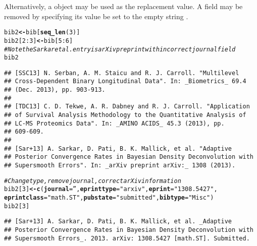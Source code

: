 \documentclass[article]{jss}\usepackage[]{graphicx}\usepackage[]{color}
\makeatletter
\newcommand{\hlnum}[1]{\textcolor[rgb]{0.125,0.125,1}{#1}}%
\newcommand{\hlstr}[1]{\textcolor[rgb]{0.125,0.125,1}{#1}}%
\newcommand{\hlcom}[1]{\textcolor[rgb]{1,0,0.753}{\textit{#1}}}%
\newcommand{\hlopt}[1]{\textcolor[rgb]{0.251,0.251,0.282}{#1}}%
\newcommand{\hlstd}[1]{\textcolor[rgb]{0.251,0.251,0.282}{#1}}%
\newcommand{\hlkwb}[1]{\textcolor[rgb]{0.439,0.251,1}{\textbf{#1}}}%
\newcommand{\hlkwc}[1]{\textcolor[rgb]{0.529,0,0.184}{\textbf{#1}}}%
\newcommand{\hlkwd}[1]{\textcolor[rgb]{0.251,0.251,0.282}{\textbf{#1}}}%
\newenvironment{kframe}{%
 \def\at@end@of@kframe{}%
 \ifinner\ifhmode%
  \def\at@end@of@kframe{\end{minipage}}%
  \begin{minipage}{\columnwidth}%
 \fi\fi%
 \def\FrameCommand##1{\hskip\@totalleftmargin \hskip-\fboxsep
 \colorbox{shadecolor}{##1}\hskip-\fboxsep
     \hskip-\linewidth \hskip-\@totalleftmargin \hskip\columnwidth}%
 \MakeFramed {\advance\hsize-\width
   \@totalleftmargin\z@ \linewidth\hsize
   \@setminipage}}%
 {\par\unskip\endMakeFramed%
 \at@end@of@kframe}
\newenvironment{knitrout}{}{} %
\makeatother
\begin{document}
Alternatively, a  object may be used as the replacement value.  A field may be removed by specifying its value be
set to the empty string .
\begin{knitrout}
\color{fgcolor}\begin{kframe}
\begin{alltt}
\hlstd{bib2} \hlkwb{<-} \hlstd{bib[}\hlkwd{seq_len}\hlstd{(}\hlnum{3}\hlstd{)]}
\hlstd{bib2[}\hlnum{2}\hlopt{:}\hlnum{3}\hlstd{]} \hlkwb{<-} \hlstd{bib[}\hlnum{5}\hlopt{:}\hlnum{6}\hlstd{]}
\hlcom{# Note the Sarkar et al. entry is arXiv preprint with incorrect journal field}
\hlstd{bib2}
\end{alltt}
\begin{verbatim}
## [SSC13] N. Serban, A. M. Staicu and R. J. Carroll. "Multilevel
## Cross-Dependent Binary Longitudinal Data". In: _Biometrics_ 69.4
## (Dec. 2013), pp. 903-913.
## 
## [TDC13] C. D. Tekwe, A. R. Dabney and R. J. Carroll. "Application
## of Survival Analysis Methodology to the Quantitative Analysis of
## LC-MS Proteomics Data". In: _AMINO ACIDS_ 45.3 (2013), pp.
## 609-609.
## 
## [Sar+13] A. Sarkar, D. Pati, B. K. Mallick, et al. "Adaptive
## Posterior Convergence Rates in Bayesian Density Deconvolution with
## Supersmooth Errors". In: _arXiv preprint arXiv:_ 1308 (2013).
\end{verbatim}
\begin{alltt}
\hlcom{# Change type, remove journal, correct arXiv information}
\hlstd{bib2[}\hlnum{3}\hlstd{]} \hlkwb{<-} \hlkwd{c}\hlstd{(}\hlkwc{journal}\hlstd{=}\hlstr{''}\hlstd{,} \hlkwc{eprinttype} \hlstd{=} \hlstr{"arxiv"}\hlstd{,} \hlkwc{eprint} \hlstd{=} \hlstr{"1308.5427"}\hlstd{,}
           \hlkwc{eprintclass} \hlstd{=} \hlstr{"math.ST"}\hlstd{,} \hlkwc{pubstate} \hlstd{=} \hlstr{"submitted"}\hlstd{,} \hlkwc{bibtype} \hlstd{=} \hlstr{"Misc"}\hlstd{)}
\hlstd{bib2[}\hlnum{3}\hlstd{]}
\end{alltt}
\begin{verbatim}
## [Sar+13] A. Sarkar, D. Pati, B. K. Mallick, et al. _Adaptive
## Posterior Convergence Rates in Bayesian Density Deconvolution with
## Supersmooth Errors_. 2013. arXiv: 1308.5427 [math.ST]. Submitted.
\end{verbatim}
\end{kframe}
\end{knitrout}
\end{document}
